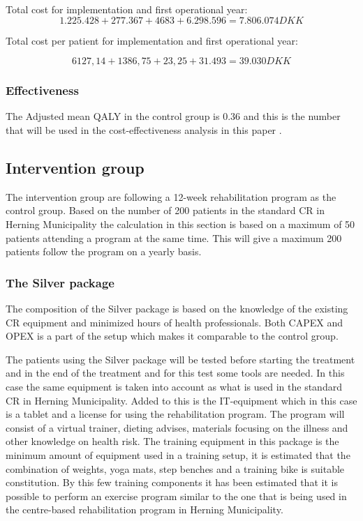 Total cost for implementation and first operational year:
$$1.225.428 + 277.367 + 4683 + 6.298.596 = 7.806.074DKK$$

Total cost per patient for implementation and first operational year:

$$6127,14+1386,75+23,25+31.493= 39.030DKK$$


\subsubsection{Effectiveness}

 The Adjusted mean QALY in the control group is 0.36 and this is the number that will be used in the cost-effectiveness analysis in this paper \cite{costeffect}. 

\subsection{Intervention group}

The intervention group are following a 12-week rehabilitation program as the control group. Based on the number of 200 patients in the standard CR in Herning Municipality the calculation in this section is based on a maximum of 50 patients attending a program at the same time. This will give a maximum 200 patients follow the program on a yearly basis. 

\subsubsection{The Silver package}

The composition of the Silver package is based on the knowledge of the existing CR equipment and minimized hours of health professionals. Both CAPEX and OPEX is a part of the setup which makes it comparable to the control group. 

The patients using the Silver package will be tested before starting the treatment and in the end of the treatment and for this test some tools are needed. In this case the same equipment is taken into account as what is used in the standard CR in Herning Municipality. Added to this is the IT-equipment which in this case is a tablet and a license for using the rehabilitation program. The program will consist of a virtual trainer, dieting advises, materials focusing on the illness and other knowledge on health risk. The training equipment in this package is the minimum amount of equipment used in a training setup, it is estimated that the combination of weights, yoga mats, step benches and a training bike is suitable constitution. By this few training components it has been estimated that it is possible to perform an exercise program similar to the one that is being used in the centre-based rehabilitation program in Herning Municipality. 

